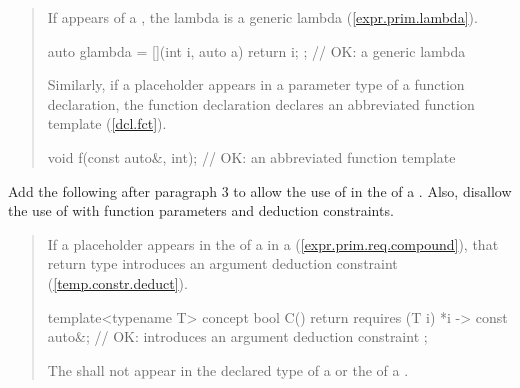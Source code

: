 \begin{quote}
\pnum
If  
appears  
 of a , the lambda 
is a generic lambda
(\ref{expr.prim.lambda}).
%
\enterexample
\begin{codeblock}
auto glambda = [](int i, auto a) { return i; }; // OK: a generic lambda
\end{codeblock}
\exitexample
%
\begin{addedblock}
Similarly, if a placeholder appears in a parameter type of a function 
declaration, the function declaration declares an abbreviated function 
template (\ref{dcl.fct}).
%
\enterexample
\begin{codeblock}
void f(const auto&, int); // OK: an abbreviated function template
\end{codeblock}
\exitexample
\end{addedblock}
\end{quote}


Add the following after paragraph 3 to allow the use of  in the
 of a .
Also, disallow the use of  with function parameters
and deduction constraints.

\begin{quote}
\begin{addedblock}
\pnum
If a placeholder appears in the 
of a  in a  
(\ref{expr.prim.req.compound}), that return type introduces an argument 
deduction constraint (\ref{temp.constr.deduct}).
% 
\enterexample
\begin{codeblock}
template<typename T> concept bool C() {
  return requires (T i) { 
    {*i} -> const auto&; // OK: introduces an argument deduction constraint
  };
}
\end{codeblock}
\exitexample

\pnum
The   shall not appear
in the declared type of a  or the
 of a .
\end{addedblock}
\end{quote}


